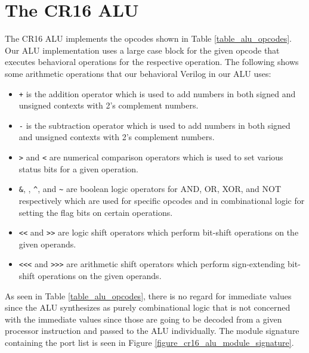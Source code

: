 \documentclass[conference]{IEEEtran}
\begin{document}
\section{The CR16 ALU}
The CR16 ALU implements the opcodes shown in Table \ref{table_alu_opcodes}. Our ALU implementation uses a large case block for the given opcode that executes behavioral operations for the respective operation. The following shows some arithmetic operations that our behavioral Verilog in our ALU uses:
\begin{itemize}
    \item \verb|+| is the addition operator which is used to add numbers in both signed and unsigned contexts with 2's complement numbers.
    \item \verb|-| is the subtraction operator which is used to add numbers in both signed and unsigned contexts with 2's complement numbers.
    \item \verb|>| and \verb|<| are numerical comparison operators which is used to set various status bits for a given operation.
    \item \verb|&|, \text{\textbar}, \verb|^|, and \verb|~| are boolean logic operators for AND, OR, XOR, and NOT respectively which are used for specific opcodes and in combinational logic for setting the flag bits on certain operations.
    \item \verb|<<| and \verb|>>| are logic shift operators which perform bit-shift operations on the given operands.
    \item \verb|<<<| and \verb|>>>| are arithmetic shift operators which perform sign-extending bit-shift operations on the given operands.
\end{itemize}
As seen in Table \ref{table_alu_opcodes}, there is no regard for immediate values since the ALU synthesizes as purely combinational logic that is not concerned with the immediate values since those are going to be decoded from a given processor instruction and passed to the ALU individually. The module signature containing the port list is seen in Figure \ref{figure_cr16_alu_module_signature}.
\end{document}
